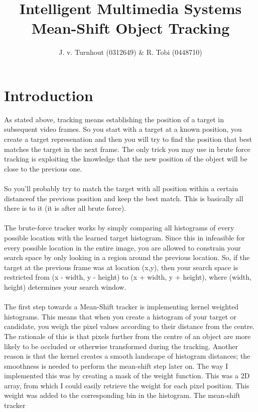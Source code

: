 \documentclass[a4paper,11pt]{article}
\title{Intelligent Multimedia Systems\\Mean-Shift Object Tracking}
\author{J. v. Turnhout (0312649) \& R. Tobi (0448710)}
\begin{document}
	\maketitle

	\section*{Introduction}
		As stated above, tracking means establishing the position of a target
		in subsequent video frames.  So you start with a target at a known
		position, you create a target represenation and then you will try to
		find the position that best matches the target in the next frame.
		The only trick you may use in brute force tracking is exploiting
		the knowledge that the new position of the object will be close
		to the previous one.
		\\ \\
		So you'll probably try to match the target with all position within
		a certain distanceof the previous position and keep the best match.
		This is basically all there is to it (it is after all brute force).
		\\ \\
		The brute-force tracker works by simply comparing all histograms
		of every possible location with the learned target histogram. Since
		this in infeasible for every possible location in the entire image,
		you are allowed to constrain your search space by only looking in a
		region around the previous location. So, if the target at the previous
		frame was at location (x,y), then your search space is restricted from
		(x - width, y - height) to (x + width, y + height), where (width, height)
		determines your search window.
		\\ \\
		The first step towards a Mean-Shift tracker is implementing kernel
		weighted histograms. This means that when you create a histogram of
		your target or candidate, you weigh the pixel values according to
		their distance from the centre. The rationale of this is that
		pixels further from the centre of an object are more likely to
		be occluded or otherwise transformed during the tracking. Another
		reason is that the kernel creates a smooth landscape of histogram
		distances; the smoothness is needed to perform the mean-shift step
		later on. The way I implemented this was by creating a mask of the
		weight function. This was a 2D array, from which I could easily
		retrieve the weight for each pixel position. This weight was added
		to the corresponding bin in the histogram. The mean-shift tracker
\end{document}
